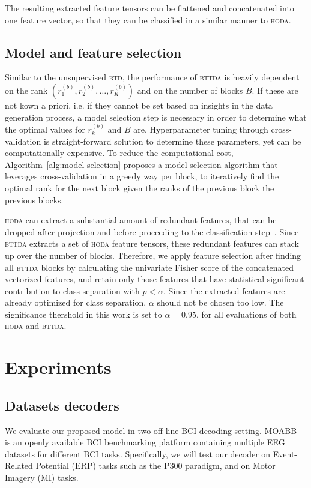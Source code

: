 \documentclass[twocolumn]{article}
\begin{document}
The resulting extracted feature tensors can be flattened and concatenated into
one feature vector, so that they can be classified in a similar manner to
\textsc{hoda}.


\subsection{Model and feature selection}
Similar to the unsupervised \textsc{btd}, the performance of \textsc{bttda} is
heavily dependent on the rank $\left(r_1^{(b)}, r_2^{(b)}, \ldots,
r_K^{(b)}\right)$ and on the number of blocks $B$.
If these are not kown a priori, i.e. if they cannot be set based on insights in the
data generation process, a model selection step is necessary in order to
determine what the optimal values for $r_k^{(b)}$ and $B$ are.
Hyperparameter tuning through cross-validation is straight-forward solution to
determine these parameters, yet can be computationally expensive.
To reduce the computational cost, Algorithm~\ref{alg:model-selection} proposes a model selection algorithm that
leverages cross-validation in a greedy way per block, to iteratively find the
optimal rank for the next block given the ranks of the previous block the previous blocks.

\textsc{hoda} can extract a substantial amount of redundant features, that can
be dropped after projection and before proceeding to the classification
step~\cite{Phan2010}.
Since \textsc{bttda} extracts a set of \textsc{hoda}
feature tensors, these redundant features can stack up over the number of
blocks.
Therefore, we apply feature selection after finding all \textsc{bttda} blocks
by calculating the univariate Fisher score of the concatenated vectorized
features, and retain only those features that have  statistical significant
contribution to class separation with $p<\alpha$.
Since the extracted features are already optimized for class separation,
$\alpha$ should not be chosen too low.
The significance thershold in this work is set to $\alpha=0.95$, for all
evaluations of both \textsc{hoda} and \textsc{bttda}.


\section{Experiments}
\subsection{Datasets decoders}
We evaluate our proposed model in two off-line BCI decoding setting.
MOABB~\cite{Aristimunha2023} is an openly available BCI benchmarking platform
containing multiple EEG datasets for different BCI tasks.
Specifically, we will test our decoder on Event-Related Potential (ERP) tasks
such as the P300 paradigm, and on Motor Imagery (MI) tasks.
\end{document}
